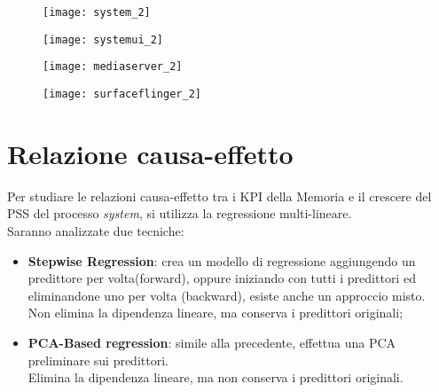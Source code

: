 \begin{minipage}{\linewidth}
  \centering
  \begin{minipage}{0.49\linewidth}
    \begin{figure}[H]
      \texttt{[image: system\_2]}
    \end{figure}
  \end{minipage}
  \begin{minipage}{0.49\linewidth}
    \begin{figure}[H]
      \texttt{[image: systemui\_2]}
    \end{figure}
  \end{minipage}
  \begin{minipage}{0.49\linewidth}
    \begin{figure}[H]
      \texttt{[image: mediaserver\_2]}
    \end{figure}
  \end{minipage}
  \begin{minipage}{0.49\linewidth}
    \begin{figure}[H]
      \texttt{[image: surfaceflinger\_2]}
    \end{figure}
  \end{minipage}
\end{minipage}
\label{and_minipage_trends2}

\clearpage

\section{Relazione causa-effetto}

Per studiare le relazioni causa-effetto tra i KPI della Memoria e il crescere
del PSS del processo \textit{system}, si utilizza la regressione multi-lineare.\\
Saranno analizzate due tecniche:

\begin{itemize}
  \item \textbf{Stepwise Regression}: crea un modello di regressione aggiungendo
  un predittore per volta(forward), oppure iniziando con tutti i predittori
  ed eliminandone uno per volta (backward), esiste anche un approccio misto.\\
  Non elimina la dipendenza lineare, ma conserva i predittori originali;
  \item \textbf{PCA-Based regression}: simile alla precedente, effettua
  una PCA preliminare sui predittori.\\
  Elimina la dipendenza lineare, ma non conserva i predittori originali.
\end{itemize}

